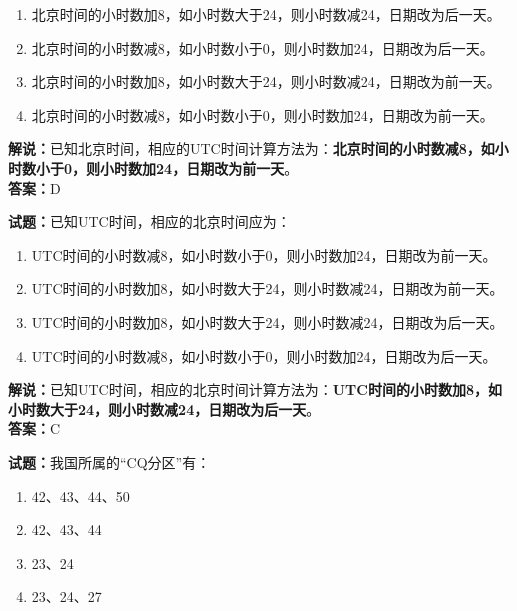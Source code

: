 \documentclass{ctexbook}
\begin{document}
\begin{enumerate}[leftmargin=3em]
	\item 北京时间的小时数加8，如小时数大于24，则小时数减24，日期改为后一天。
	\item 北京时间的小时数减8，如小时数小于0，则小时数加24，日期改为后一天。
	\item 北京时间的小时数加8，如小时数大于24，则小时数减24，日期改为前一天。
	\item 北京时间的小时数减8，如小时数小于0，则小时数加24，日期改为前一天。
\end{enumerate}

\noindent\textbf{解说：}已知北京时间，相应的UTC时间计算方法为：\textbf{北京时间的小时数减8，如小时数小于0，则小时数加24，日期改为前一天}。\\\noindent\textbf{答案：}D


\bigskip


\noindent\textbf{试题：}已知UTC时间，相应的北京时间应为：

\begin{enumerate}[leftmargin=3em]
	\item UTC时间的小时数减8，如小时数小于0，则小时数加24，日期改为前一天。
	\item UTC时间的小时数加8，如小时数大于24，则小时数减24，日期改为前一天。
	\item UTC时间的小时数加8，如小时数大于24，则小时数减24，日期改为后一天。
	\item UTC时间的小时数减8，如小时数小于0，则小时数加24，日期改为后一天。
\end{enumerate}

\noindent\textbf{解说：}已知UTC时间，相应的北京时间计算方法为：\textbf{UTC时间的小时数加8，如小时数大于24，则小时数减24，日期改为后一天}。\\\noindent\textbf{答案：}C


\bigskip


\noindent\textbf{试题：}我国所属的“CQ分区”有：

\begin{enumerate}[leftmargin=3em]
	\item 42、43、44、50
	\item 42、43、44
	\item 23、24
	\item 23、24、27
\end{enumerate}
\end{document}
